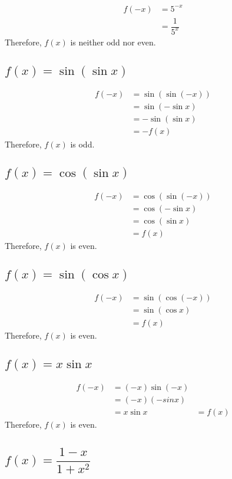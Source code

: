 \documentclass[fleqn, a4paper, 10pt]{article}
\begin{document}
\begin{align*}
	f(-x) &= 5^{-x}\\
	&= \dfrac{1}{5^x}
\end{align*}
Therefore, $f(x)$ is neither odd nor even.

\subsection{$f(x) = \sin(\sin x)$}

\begin{align*}
	f(-x) &= \sin(\sin (-x))\\
	&= \sin(-\sin x)\\
	&= - \sin(\sin x)\\
	&= -f(x)
\end{align*}
Therefore, $f(x)$ is odd.

\subsection{$f(x) = \cos(\sin x)$}

\begin{align*}
	f(-x) &= \cos(\sin (-x))\\
	&= \cos(-\sin x)\\
	&= \cos(\sin x)\\
	&= f(x)
\end{align*}
Therefore, $f(x)$ is even.

\subsection{$f(x) = \sin(\cos x)$}

\begin{align*}
	f(-x) &= \sin(\cos (-x))\\
	&= \sin(\cos x)\\
	&= f(x)
\end{align*}
Therefore, $f(x)$ is even.

\subsection{$f(x) = x \sin x$}

\begin{align*}
	f(-x) &= (-x) \sin (-x)\\
	&= (-x)(-sin x)\\
	&= x \sin x
	&= f(x)
\end{align*}
Therefore, $f(x)$ is even.

\subsection{$f(x) = \dfrac{1 - x}{1 + x^2}$}
\end{document}
